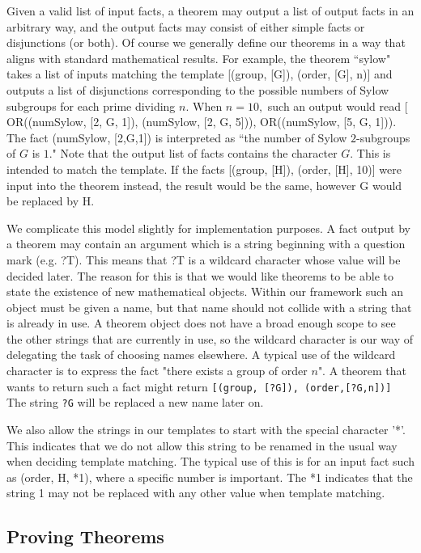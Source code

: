 \documentclass[11pt,
oneside]{article} %
\begin{document}
Given a valid list of input facts, a theorem may output a list of
output facts in an arbitrary way, and the output facts may consist of
either simple facts or disjunctions (or both).  Of course we generally
define our theorems in a way that aligns with standard mathematical
results.  For example, the theorem ``sylow" takes a list of inputs
matching the template [(group, [G]), (order, [G], n)] and outputs a
list of disjunctions corresponding to the possible numbers of Sylow
subgroups for each prime dividing $n$.  When $n=10,$ such an output
would read [ OR((numSylow, [2, G, 1]), (numSylow, [2, G, 5])),
OR((numSylow, [5, G, 1])). The fact (numSylow, [2,G,1]) is interpreted
as ``the number of Sylow $2$-subgroups of $G$ is $1$."  Note that the
output list of facts contains the character $G$.  This is intended to
match the template.  If the facts [(group, [H]), (order, [H], 10)]
were input into the theorem instead, the result would be the same,
however G would be replaced by H.

We complicate this model slightly for implementation purposes.  A fact
output by a theorem may contain an argument which is a string
beginning with a question mark (e.g. ?T).  This means that ?T is a
wildcard character whose value will be decided later.  The reason for
this is that we would like theorems to be able to state the existence
of new mathematical objects.  Within our framework such an object must
be given a name, but that name should not collide with a string that
is already in use.  A theorem object does not have a broad enough
scope to see the other strings that are currently in use, so the
wildcard character is our way of delegating the task of choosing names
elsewhere.  A typical use of the wildcard character is to express the
fact "there exists a group of order $n$".  A theorem that wants to
return such a fact might return \texttt{[(group, [?G]),
  (order,[?G,n])]} The string \texttt{?G} will be replaced a new name
later on.

We also allow the strings in our templates to start with the special
character '*'. This indicates that we do not allow this string to be
renamed in the usual way when deciding template matching.  The typical
use of this is for an input fact such as (order, H, *1), where a
specific number is important. The *1 indicates that the string 1 may
not be replaced with any other value when template matching.

\subsection{Proving Theorems}
\end{document}

